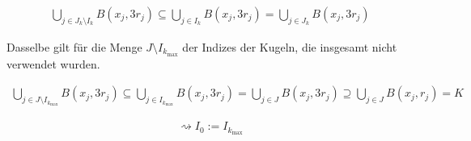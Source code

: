 \begin{solution}
\begin{align*}
    \bigcup_{j \in J_k \setminus I_k}
        B(x_j, 3 r_j)
    \subseteq
    \bigcup_{j \in I_k}
        B(x_j, 3 r_j)
    =
    \bigcup_{j \in J_k}
        B(x_j, 3 r_j)
\end{align*}

Dasselbe gilt für die Menge $J \setminus I_{k_{\max}}$ der Indizes der Kugeln, die insgesamt nicht verwendet wurden.

\begin{align*}
    \bigcup_{j \in J \setminus I_{k_{\max}}}
        B(x_j, 3 r_j)
    \subseteq
    \bigcup_{j \in I_{k_{\max}}}
        B(x_j, 3 r_j)
    =
    \bigcup_{j \in J}
        B(x_j, 3 r_j)
    \supseteq
    \bigcup_{j \in J}
        B(x_j, r_j)
    =
    K
\end{align*}

\begin{align*}
    \rightsquigarrow
    I_0 := I_{k_{\max}}
\end{align*}

\begin{comment}

Wir können also Folgendes machen.
Wir wählen $I_0$ als die größte obige Auswahl, sodass die Vereinigung der, auf das $3$-fache aufgeblasenen, Kugeln nicht ganz $K$ ist.

\begin{align*}
    m
    :=
    \max
    \Bbraces
    {
        k = 1, \dots, n:
        \bigcup_{j \in I_k}
            B(x_j, 3 r_j)
        \subsetneq
        K
    }
    +
    1,
    \quad
    I_0 := \Bbraces{i_1, \dots, i_m}
\end{align*}

\end{comment}

\end{solution}

